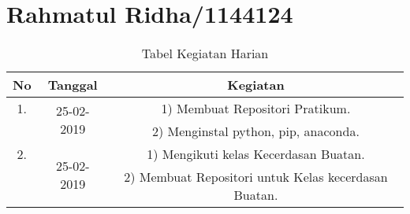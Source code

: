 \chapter{Rahmatul Ridha/1144124}

\begin{table}[h]
\caption{Tabel Kegiatan Harian}
\centering
\begin{tabular}{|c|c|c|}
\hline
No&Tanggal&Kegiatan\\
\hline
1.&\multirow{2}{*}{25-02-2019}&1) Membuat Repositori Pratikum.\\
&&2) Menginstal python, pip, anaconda.\\
\hline
2.&\multirow{2}{*}{25-02-2019}&1) Mengikuti kelas Kecerdasan Buatan.\\
&&2) Membuat Repositori untuk Kelas kecerdasan Buatan.\\
\hline
\end{tabular}
\label{table:contoh}
\end{table}
